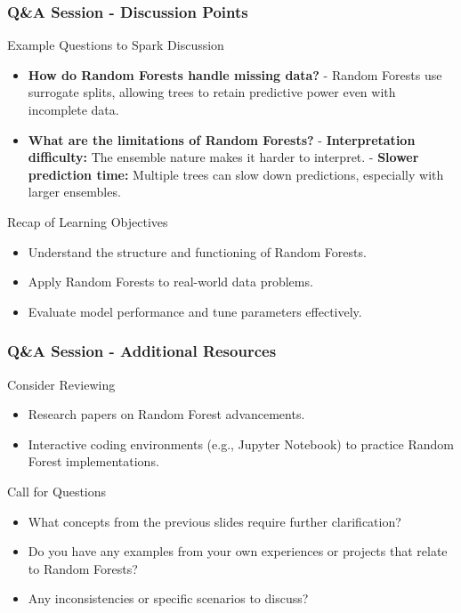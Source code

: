 \documentclass[aspectratio=169]{beamer}
\begin{document}
\begin{frame}[fragile]
    \frametitle{Q\&A Session - Discussion Points}
    \begin{block}{Example Questions to Spark Discussion}
        \begin{itemize}
            \item \textbf{How do Random Forests handle missing data?}
                - Random Forests use surrogate splits, allowing trees to retain predictive power even with incomplete data.
            \item \textbf{What are the limitations of Random Forests?}
                - \textbf{Interpretation difficulty:} The ensemble nature makes it harder to interpret.
                - \textbf{Slower prediction time:} Multiple trees can slow down predictions, especially with larger ensembles.
        \end{itemize}
    \end{block}
    
    \begin{block}{Recap of Learning Objectives}
        \begin{itemize}
            \item Understand the structure and functioning of Random Forests.
            \item Apply Random Forests to real-world data problems.
            \item Evaluate model performance and tune parameters effectively.
        \end{itemize}
    \end{block}
\end{frame}

\begin{frame}[fragile]
    \frametitle{Q\&A Session - Additional Resources}
    \begin{block}{Consider Reviewing}
        \begin{itemize}
            \item Research papers on Random Forest advancements.
            \item Interactive coding environments (e.g., Jupyter Notebook) to practice Random Forest implementations.
        \end{itemize}
    \end{block}
    
    \begin{block}{Call for Questions}
        \begin{itemize}
            \item What concepts from the previous slides require further clarification?
            \item Do you have any examples from your own experiences or projects that relate to Random Forests?
            \item Any inconsistencies or specific scenarios to discuss?
        \end{itemize}
    \end{block}
\end{frame}
\end{document}
